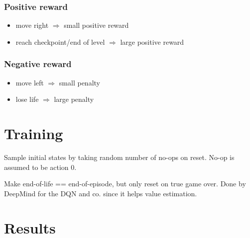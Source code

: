 \documentclass{article}
\begin{document}
    \subsubsection*{Positive reward}
    \begin{itemize}
        \item move right $\Rightarrow$ small positive reward
        \item reach checkpoint/end of level $\Rightarrow$ large positive reward
    \end{itemize}
    \subsubsection*{Negative reward}
    \begin{itemize}
        \item move left $\Rightarrow$ small penalty
        \item lose life $\Rightarrow$ large penalty
    \end{itemize}

    \section{Training}
    Sample initial states by taking random number of no-ops on reset.
    No-op is assumed to be action 0.

    Make end-of-life == end-of-episode, but only reset on true game over.
    Done by DeepMind for the DQN and co. since it helps value estimation.

    \section{Results}
\end{document}
